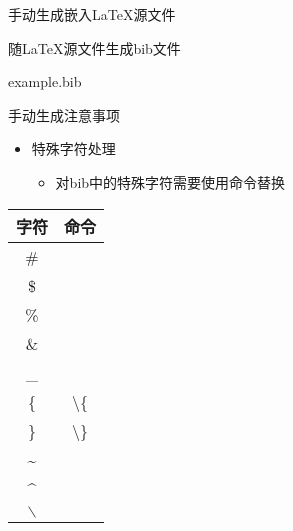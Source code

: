 \documentclass[fontset = none, t]{ctexbeamer}
\begin{document}
\begin{frame}[fragile]{手动生成}{嵌入\LaTeX 源文件}
\begin{spacing}{1.3}
\begin{center}
\begin{minipage}[h]{0.55\linewidth}
\begin{textcb}{随\LaTeX 源文件生成bib文件}
\begin{filecontents}{example.bib}
\begin{frame}[fragile]{手动生成}{注意事项}
  \begin{spacing}{1.3}
    \begin{itemize}
    \item 特殊字符处理
      \begin{itemize}
      \item 对bib中的特殊字符需要使用命令替换
      \end{itemize}
    \end{itemize}
    \begin{center}
      \scriptsize
      \begin{tabular}[h]{|c|c|}        
        \hline
        字符 & 命令 \\ \hline
        \# & \texinline[fontsize=\scriptsize]{\#} \\ \hline
        \$ & \texinline[fontsize=\scriptsize]{\$} \\ \hline
        \% & \texinline[fontsize=\scriptsize]{\%} \\ \hline
        \& & \texinline[fontsize=\scriptsize]{\&} \\ \hline
        \_ & \texinline[fontsize=\scriptsize]{\_} \\ \hline
        \{ & \textbackslash\{ \\ \hline
        \} & \textbackslash\} \\ \hline
        \~{} & \texinline[fontsize=\scriptsize]{\~{}} \\ \hline
        \^{} & \texinline[fontsize=\scriptsize]{\^{}} \\ \hline
        $\backslash$ & \texinline[fontsize=\scriptsize]{$\backslash$} \\ \hline   
      \end{tabular}
    \end{center}
  \end{spacing}  
\end{frame}


\end{filecontents}
\end{textcb}
\end{minipage}
\end{center}
\end{spacing}
\end{frame}
\end{document}

